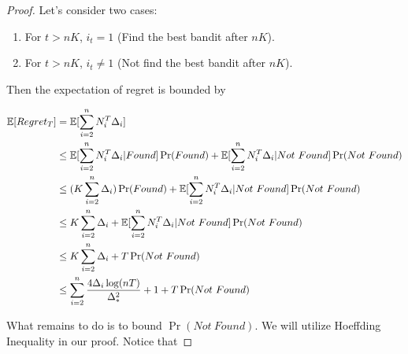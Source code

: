 \documentclass[../main.tex]{subfiles}
\begin{document}
\begin{proof}
	Let's consider two cases:
		\begin{enumerate}
			\item For $t > nK$, $i_t = 1$ (Find the best bandit after $nK$).
			\item For $t > nK$, $i_t \neq 1$ (Not find the best bandit after $nK$).
		\end{enumerate}
	
	Then the expectation of regret is bounded by
	
	\begin{equation*}
		\begin{aligned}
			\mathbb{E}[Regret_T] &= \mathbb{E}[\sum\limits_{i=2}^n N_i^T \Delta_i] \\
						  &\leq \mathbb{E}[\sum\limits_{i=2}^n N_i^T \Delta_i | Found] \Pr(Found) + \mathbb{E}[\sum\limits_{i=2}^n N_i^T \Delta_i |Not \ Found] \Pr(Not \ Found)  \\
						  &\leq (K \sum\limits_{i=2}^n \Delta_i) \Pr(Found) + \mathbb{E}[\sum\limits_{i=2}^n N_i^T \Delta_i |Not \ Found] \Pr(Not \ Found) \\
  						  &\leq K \sum\limits_{i=2}^n \Delta_i  + \mathbb{E}[\sum\limits_{i=2}^n N_i^T \Delta_i |Not \ Found] \Pr(Not \ Found) \\
 						  &\leq K \sum\limits_{i=2}^n \Delta_i  + T \Pr(Not \ Found) \\
 						  &\leq \sum\limits_{i=2}^n  \frac{4\Delta_i \log(nT)}{\Delta_*^2} + 1 + T \Pr(Not \ Found) 
		\end{aligned}
	\end{equation*}
	
	What remains to do is to bound $\Pr(Not\ Found)$. We will utilize Hoeffding Inequality in our proof. Notice that
	

\end{proof}
\end{document}
